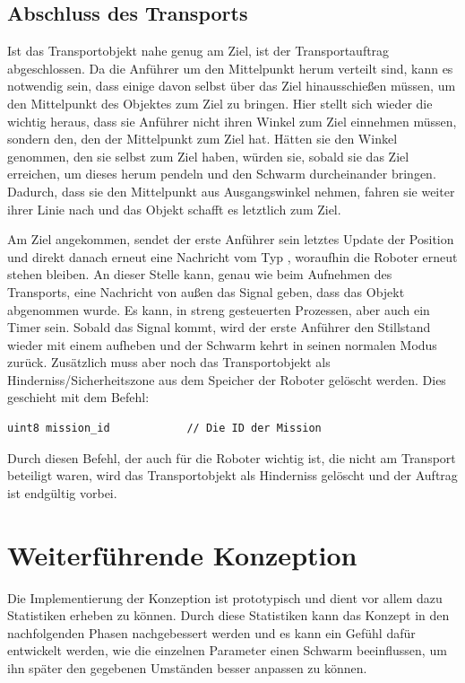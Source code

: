 \subsection*{Abschluss des Transports}

Ist das Transportobjekt nahe genug am Ziel, ist der Transportauftrag abgeschlossen. Da die Anführer um den Mittelpunkt herum verteilt sind, kann es notwendig sein, dass einige davon selbst über das Ziel hinausschießen müssen, um den Mittelpunkt des Objektes zum Ziel zu bringen. Hier stellt sich wieder die wichtig heraus, dass sie Anführer nicht ihren Winkel zum Ziel einnehmen müssen, sondern den, den der Mittelpunkt zum Ziel hat. Hätten sie den Winkel genommen, den sie selbst zum Ziel haben, würden sie, sobald sie das Ziel erreichen, um dieses herum pendeln und den Schwarm durcheinander bringen. Dadurch, dass sie den Mittelpunkt aus Ausgangswinkel nehmen, fahren sie weiter ihrer Linie nach und das Objekt schafft es letztlich zum Ziel.

Am Ziel angekommen, sendet der erste Anführer sein letztes Update der Position und direkt danach erneut eine Nachricht vom Typ , woraufhin die Roboter erneut stehen bleiben. An dieser Stelle kann, genau wie beim Aufnehmen des Transports, eine Nachricht von außen das Signal geben, dass das Objekt abgenommen wurde. Es kann, in streng gesteuerten Prozessen, aber auch ein Timer sein. Sobald das Signal kommt, wird der erste Anführer den Stillstand wieder mit einem  aufheben und der Schwarm kehrt in seinen normalen Modus zurück. Zusätzlich muss aber noch das Transportobjekt als Hinderniss/Sicherheitszone aus dem Speicher der Roboter gelöscht werden. Dies geschieht mit dem Befehl:

\begin{lstlisting}[style=ros, title=Nachrichten-Typ: Delete\_Object]
uint8 mission_id			// Die ID der Mission
\end{lstlisting}

Durch diesen Befehl, der auch für die Roboter wichtig ist, die nicht am Transport beteiligt waren, wird das Transportobjekt als Hinderniss gelöscht und der Auftrag ist endgültig vorbei.

\section{Weiterführende Konzeption}

Die Implementierung der Konzeption ist prototypisch und dient vor allem dazu Statistiken erheben zu können. Durch diese Statistiken kann das Konzept in den nachfolgenden Phasen nachgebessert werden und es kann ein Gefühl dafür entwickelt werden, wie die einzelnen Parameter einen Schwarm beeinflussen, um ihn später den gegebenen Umständen besser anpassen zu können.

